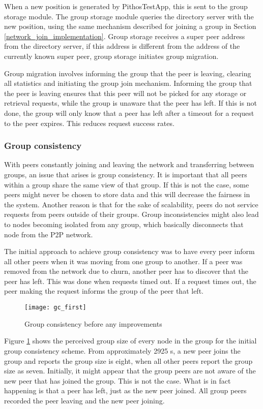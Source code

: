     When a new position is generated by PithosTestApp, this is sent to the group storage module. The group storage module queries the directory server with the new position, using the same mechanism described for joining a group in Section \ref{network_join_implementation}. Group storage receives a super peer address from the directory server, if this address is different from the address of the currently known super peer, group storage initiates group migration.

    Group migration involves informing the group that the peer is leaving, clearing all statistics and initiating the group join mechanism. Informing the group that the peer is leaving ensures that this peer will not be picked for any storage or retrieval requests, while the group is unaware that the peer has left. If this is not done, the group will only know that a peer has left after a timeout for a request to the peer expires. This reduces request success rates.

    \subsubsection{Group consistency}
    \label{group_migration_implementation}

    With peers constantly joining and leaving the network and transferring between groups, an issue that arises is group consistency. It is important that all peers within a group share the same view of that group. If this is not the case, some peers might never be chosen to store data and this will decrease the fairness in the system. Another reason is that for the sake of scalability, peers do not service requests from peers outside of their groups. Group inconsistencies might also lead to nodes becoming isolated from any group, which basically disconnects that node from the P2P network.
    
The initial approach to achieve group consistency was to have every peer inform all other peers when it was moving from one group to another. If a peer was removed from the network due to churn, another peer has to discover that the peer has left. This was done when requests timed out. If a request times out, the peer making the request informs the group of the peer that left.
    
    \begin{figure}[htbp]
 \centering
 \texttt{[image: gc\_first]}
 \caption{Group consistency before any improvements}
 \label{fig_gc_first}
\end{figure}
%
Figure \ref{fig_gc_first} shows the perceived group size of every node in the group for the initial group consistency scheme. From approximately 2925 s, a new peer joins the group and reports the group size is eight, when all other peers report the group size as seven. Initially, it might appear that the group peers are not aware of the new peer that has joined the group. This is not the case. What is in fact happening is that a peer has left, just as the new peer joined. All group peers recorded the peer leaving and the new peer joining.

